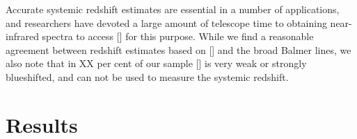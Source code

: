 Accurate systemic redshift estimates are essential in a number of applications, and researchers have devoted a large amount of telescope time to obtaining near-infrared spectra to access [] for this purpose. 
While we find a reasonable agreement between redshift estimates based on [] and the broad Balmer lines, we also note that in XX per cent of our sample [] is very weak or strongly blueshifted, and can not be used to measure the systemic redshift. 

\section{Results}

\begin{figure}
    \captionsetup[subfigure]{labelformat=empty}
    \centering
    \subfloat[\label{fig:parameter_hists_a}]{}
    \subfloat[\label{fig:parameter_hists_b}]{}
    \subfloat[\label{fig:parameter_hists_c}]{}

\end{figure}
